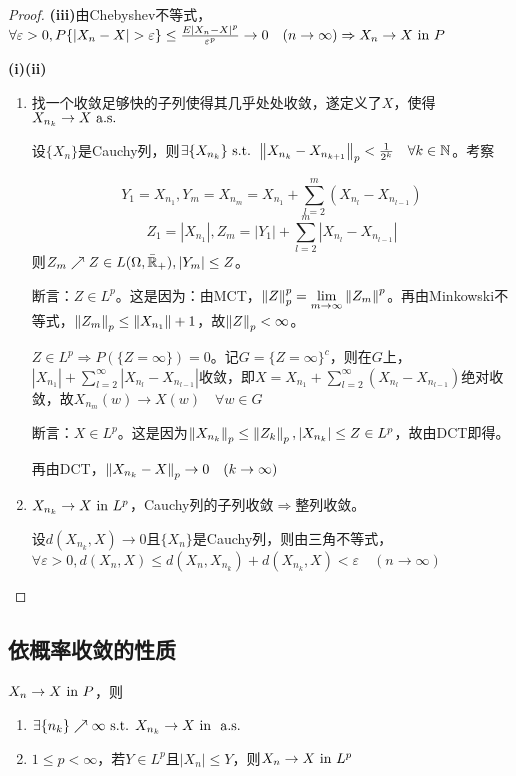 \documentclass{ctexart}
\begin{document}
  \begin{proof}
    \textbf{(iii)}由Chebyshev不等式，$\forall \varepsilon>0, P\{|X_{n}-X|>\varepsilon\}\leq \frac{E|X_{n}-X|^{p}}{\varepsilon^{p}}\to 0\quad (n\to\infty)\Rightarrow X_{n}\to X\cvin P$

    \textbf{(i)(ii)}
    \begin{enumerate}
    \item 找一个收敛足够快的子列使得其几乎处处收敛，遂定义了$X$，使得$X_{n_{k}}\to X\text{ a.s. }$

      设$\{X_{n}\}$是Cauchy列，则$\exists\{X_{n_{k}}\}\text{ s.t. } \left\|X_{n_{k}}-X_{n_{{k+1}}}\right\|_{p}<\frac{1}{2^{k}}\quad \forall k\in\mathbb{N}$。考察

      \[Y_{1}=X_{n_{1}},Y_{m}=X_{n_{m}}=X_{n_{1}}+\sum_{l=2}^{m}(X_{n_{l}}-X_{n_{l-1}})\]
      \[Z_{1}=|X_{n_{1}}|,Z_{m}=|Y_{1}|+\sum_{l=2}^{m}|X_{n_{l}}-X_{n_{l-1}}|\]
      则$Z_{m}\nearrow Z\in L(\Omega,\bar{\mathbb{R}}_{+}), |Y_{m}|\leq Z$。

      断言：$Z\in L^{p}$。这是因为：由MCT，$\left\|Z\right\|_{p}^{p}=\lim\limits_{m\to\infty}\left\|Z_{m}\right\|^{p}$。再由Minkowski不等式，$\left\|Z_{m}\right\|_{p}\leq \left\|X_{n_{1}}\right\|+1$，故$\left\|Z\right\|_{p}<\infty$。

      $Z\in L^{p}\Rightarrow P(\{Z=\infty\})=0$。记$G=\{Z=\infty\}^{c}$，则在$G$上，$|X_{n_{1}}|+\sum_{l=2}^{\infty}|X_{n_{l}}-X_{n_{l-1}}|$收敛，即$X=X_{n_{1}}+\sum_{l=2}^{\infty}(X_{n_{l}}-X_{n_{l-1}})$绝对收敛，故$X_{n_{m}}(w)\to X(w)\quad\forall w\in G$

      断言：$X\in L^{p}$。这是因为$\left\|X_{n_{k}}\right\|_{p}\leq\left\|Z_{k}\right\|_{p}, |X_{n_{k}}|\leq Z\in L^{p}$，故由DCT即得。

      再由DCT，$\left\|X_{n_{k}}-X\right\|_{p}\to 0\quad (k\to\infty)$
    \item $X_{n_{k}}\to X\text{ in } L^{p}$，Cauchy列的子列收敛$\Rightarrow $整列收敛。

      设$d(X_{n_{k}},X)\to 0$且$\{X_{n}\}$是Cauchy列，则由三角不等式，$\forall\varepsilon>0, d(X_{n},X)\leq d(X_{n},X_{n_{k}})+d(X_{n_{k}},X)<\varepsilon\quad (n\to\infty)$
    \end{enumerate}
  \end{proof}

\subsection{依概率收敛的性质}
\begin{Prop}
  $X_{n}\to X\text{ in } P$，则
  \begin{enumerate}
  \item $\exists \{n_{k}\}\nearrow \infty\text{ s.t. } X_{n_{k}}\to X\text{ in }\text{ a.s. }$
  \item $1\leq p<\infty$，若$Y\in L^{p}$且$|X_{n}|\leq Y$，则$X_{n}\to X\text{ in } L^{p}$
  \end{enumerate}
\end{Prop}
\end{document}
